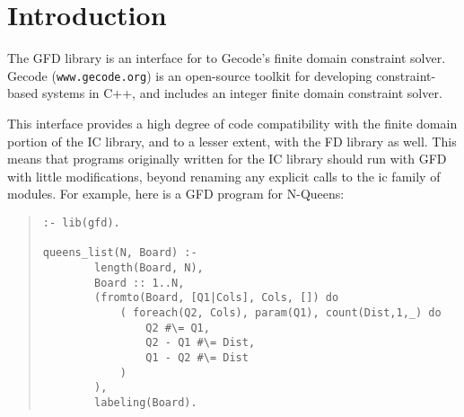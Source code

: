 %
% 
% 
% 
% 


\section{Introduction}

   The GFD library is an interface for \eclipse to Gecode's finite domain constraint
   solver. Gecode ({\tt www.gecode.org}) is an open-source toolkit for 
   developing
   constraint-based systems in C++, and includes an  integer 
   finite domain constraint solver.

   This interface provides a high degree of code compatibility with the finite 
   domain portion of the IC library, and to a lesser extent, with the FD
   library as well. This means that programs originally written for the
   IC library should run with GFD with little modifications, beyond 
   renaming any explicit calls to the ic family of modules. For example,
   here is a GFD program for N-Queens:

\begin{quote}
\begin{verbatim}
:- lib(gfd).

queens_list(N, Board) :-
        length(Board, N),
        Board :: 1..N,
        (fromto(Board, [Q1|Cols], Cols, []) do
            ( foreach(Q2, Cols), param(Q1), count(Dist,1,_) do
                Q2 #\= Q1,
                Q2 - Q1 #\= Dist,
                Q1 - Q2 #\= Dist
            )
        ),
        labeling(Board).  

\end{verbatim}
\end{quote}

